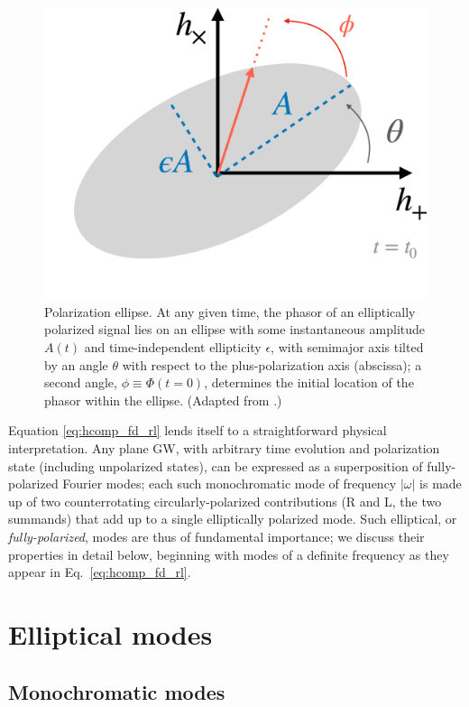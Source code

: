 \documentclass[aps,prd,twocolumn,superscriptaddress,preprintnumbers,floatfix,nofootinbib]{revtex4-2}
\newcommand*{\eq}[1]{Eq.~\eqref{eq:#1}}
\begin{document}
\begin{figure}
\includegraphics[width=0.6\columnwidth]{ellipse}
\caption{Polarization ellipse. At any given time, the phasor of an elliptically polarized signal lies on an ellipse with some instantaneous amplitude $A(t)$ and time-independent ellipticity $\epsilon$, with semimajor axis tilted by an angle $\theta$ with respect to the plus-polarization axis (abscissa); a second angle, $\phi \equiv \Phi(t=0)$, determines the initial location of the phasor within the ellipse. (Adapted from \cite{Isi:2021iql}.)}
\label{fig:ellipse}
\end{figure}

Equation \eqref{eq:hcomp_fd_rl} lends itself to a straightforward physical interpretation.
Any plane GW, with arbitrary time evolution and polarization state (including unpolarized states), can be expressed as a superposition of fully-polarized Fourier modes;
each such monochromatic mode of frequency $|\omega|$ is made up of two counterrotating circularly-polarized contributions (R and L, the two summands) that add up to a single elliptically polarized mode.
Such elliptical, or \emph{fully-polarized}, modes are thus of fundamental importance; we discuss their properties in detail below, beginning with modes of a definite frequency as they appear in \eq{hcomp_fd_rl}.

\section{Elliptical modes}
\label{sec:ellip}

\subsection{Monochromatic modes}
\label{sec:ellip:mono}
\end{document}
